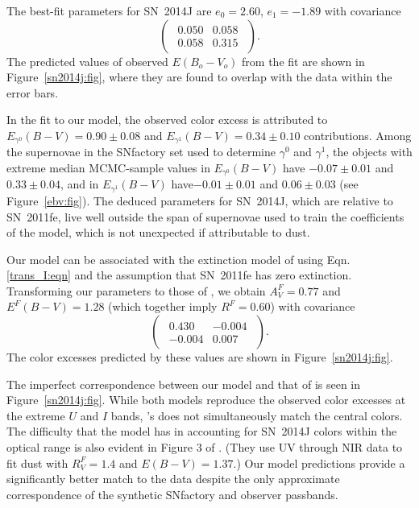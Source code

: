 \documentclass{aastex61}   	%
\begin{document}
The best-fit parameters for SN~2014J are 
$e_0= 2.60$, $ e_1=-1.89$ with covariance
\begin{equation}
\begin{pmatrix}
\begin{array}{rr}
0.050 & 0.058 \\
0.058 & 0.315
\end{array}
\end{pmatrix}.
\end{equation}
The predicted values of observed $E(B_o-V_o)$ from the fit are shown in Figure~\ref{sn2014j:fig}, where they are found to
overlap with the data within the error bars. 



In the fit to our model, the observed color excess is attributed to 
$E_{\gamma^0}(B-V)=  0.90 \pm   0.08$ and  $E_{\gamma^1}(B-V)=  0.34 \pm   0.10$
contributions.
Among the supernovae in the SNfactory  set used to determine $\gamma^0$ and $\gamma^1$, the
objects with extreme median MCMC-sample values in $E_{\gamma^0}(B-V)$ have 
$-0.07 \pm 0.01$ and  $  0.33 \pm 0.04$, and in $E_{\gamma^1}(B-V)$  have$-0.01 \pm 0.01$  and
$  0.06 \pm 0.03$ 
(see Figure~\ref{ebv:fig}).
The deduced parameters for SN~2014J, which are relative to SN~2011fe, live well outside the 
span of supernovae used to train the coefficients of the model, which is not unexpected if
attributable to dust. 



\color{purple}
Our model can be associated with the extinction model of   using Eqn.\ref{trans_I:eqn}
and the assumption that  SN~2011fe has zero extinction.  Transforming our parameters to those
of   , we obtain
$A^F_V=0.77$ and $E^F(B-V)=1.28$ (which together imply $R^F=0.60$) with covariance
\begin{equation}
\begin{pmatrix}
\begin{array}{rr}
0.430 & -0.004 \\
-0.004 & 0.007
\end{array}
\end{pmatrix}.
\end{equation}
The color excesses predicted by these values are shown in Figure~\ref{sn2014j:fig}.

The imperfect correspondence between our model and that of    is seen in Figure~\ref{sn2014j:fig}.
While both models reproduce the observed color excesses at the extreme $U$ and $I$ bands,  's
does not simultaneously match the central colors.
The difficulty that  the   model has in accounting for SN~2014J colors within the optical range is also evident
in Figure 3 of  \citet{2014ApJ...788L..21A}.  (They use
UV through NIR data to fit \citet{1999PASP..111...63F} dust with $R_V^F=1.4$ and $E(B-V)=1.37$.)
Our model predictions provide a significantly better match to the data
despite the only approximate correspondence of the synthetic SNfactory and \citet{2014ApJ...788L..21A} observer passbands.
\end{document}
